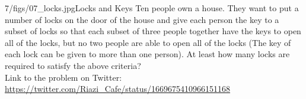 \begin{problem}{7/figs/07_locks.jpg}{Locks and Keys} Ten people own a house. They want to put a number of locks on the door of the house and give each person the key to a subset of locks so that each subset of three people together have the keys to open all of the locks, but no two people are able to open all of the locks (The key of each lock can be given to more than one person).  At least how many locks are required to satisfy the above criteria?\\[0.2cm]

Link to the problem on Twitter:  \url{https://twitter.com/Riazi_Cafe/status/1669675410966151168}\end{problem}